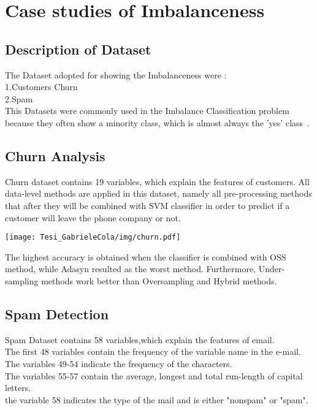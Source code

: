 \chapter{Case studies of Imbalanceness}

\section{Description of Dataset}
The Dataset adopted for showing the Imbalanceness were : \noindent \\
1.Customers Churn \noindent \\
2.Spam \noindent \\

This Datasets were commonly used in the Imbalance Classification problem because they often show a minority class, which is almost always the 'yes' class~\cite{zhu2019iric}.  



\section{Churn Analysis}
Churn dataset contains 19 variables, which explain the features of customers.
 All data-level methods are applied in this dataset, namely all pre-processing methods that after they will be combined with SVM classifier in order to predict if a customer will leave the phone company or not.\noindent \\

\begin{center}
\texttt{[image: Tesi\_GabrieleCola/img/churn.pdf]}
\end{center}

The highest accuracy is obtained  when the classifier is combined with OSS method, while Adasyn resulted as the worst method.
Furthermore, Under-sampling methods work better than Oversampling and Hybrid methods. \noindent \\

\section{Spam Detection}
Spam Dataset contains 58 variables,which explain the features of email. \noindent \\
The first 48 variables contain the frequency of the variable name in the e-mail. \noindent \\
The variables 49-54 indicate the frequency of the characters.\noindent \\
The variables 55-57 contain the average, longest and total run-length of capital letters.\noindent \\
 the variable 58 indicates the type of the mail and is either "nonspam" or "spam".\noindent \\

